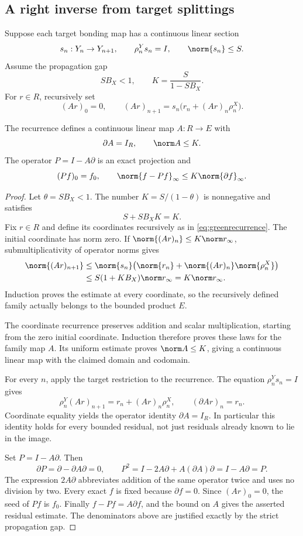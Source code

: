 \subsection{A right inverse from target splittings}
Suppose each target bonding map has a continuous linear section
\[
 s_n:Y_n\to Y_{n+1},\qquad \rho^Y_ns_n=I,\qquad \norm{s_n}\le S.
\]
Assume the propagation gap
\begin{equation}\label{eq:splitgap}
 SB_X<1,\qquad K=\frac{S}{1-SB_X}.
\end{equation}
For \(r\in R\), recursively set
\begin{equation}\label{eq:greenrecurrence}
 (Ar)_0=0,\qquad
 (Ar)_{n+1}=s_n\bigl(r_n+(Ar)_n\rho^X_n\bigr).
\end{equation}

\begin{theorem}\label{KS20}
The recurrence defines a continuous linear map \(A:R\to E\) with
\[
 \partial A=I_R,\qquad \norm A\le K.
\]
The operator \(P=I-A\partial\) is an exact projection and
\[
 (Pf)_0=f_0,\qquad
 \norm{f-Pf}_\infty\le K\norm{\partial f}_\infty.
\]
\end{theorem}
\begin{proof}
Let $\theta=SB_X<1$. The number $K=S/(1-\theta)$ is nonnegative and satisfies
\[
 S+SB_XK=K.
\]
Fix $r\in R$ and define its coordinates recursively as in \eqref{eq:greenrecurrence}. The initial coordinate has norm zero. If $\norm{(Ar)_n}\le K\norm r_\infty$, submultiplicativity of operator norms gives
\[
 \begin{aligned}
 \norm{(Ar)_{n+1}}
 &\le\norm{s_n}\bigl(\norm{r_n}+\norm{(Ar)_n}\norm{\rho^X_n}\bigr)\\
 &\le S(1+KB_X)\norm r_\infty=K\norm r_\infty.
 \end{aligned}
\]
Induction proves the estimate at every coordinate, so the recursively defined family actually belongs to the bounded product $E$.

The coordinate recurrence preserves addition and scalar multiplication, starting from the zero initial coordinate. Induction therefore proves these laws for the family map $A$. Its uniform estimate proves $\norm A\le K$, giving a continuous linear map with the claimed domain and codomain.

For every $n$, apply the target restriction to the recurrence. The equation $\rho^Y_ns_n=I$ gives
\[
 \rho^Y_n(Ar)_{n+1}=r_n+(Ar)_n\rho^X_n,
 \qquad (\partial Ar)_n=r_n.
\]
Coordinate equality yields the operator identity $\partial A=I_R$. In particular this identity holds for every bounded residual, not just residuals already known to lie in the image.

Set $P=I-A\partial$. Then
\[
 \partial P=\partial-\partial A\partial=0,\qquad
 P^2=I-2A\partial+A(\partial A)\partial=I-A\partial=P.
\]
The expression $2A\partial$ abbreviates addition of the same operator twice and uses no division by two. Every exact $f$ is fixed because $\partial f=0$. Since $(Ar)_0=0$, the seed of $Pf$ is $f_0$. Finally $f-Pf=A\partial f$, and the bound on $A$ gives the asserted residual estimate. The denominators above are justified exactly by the strict propagation gap.
\end{proof}
